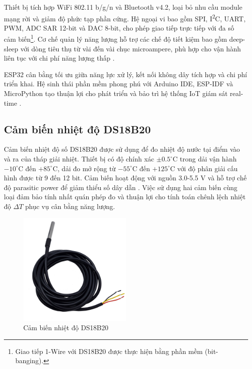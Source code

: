 \documentclass[../main.tex]{subfiles}
\begin{document}
Thiết bị tích hợp WiFi 802.11 b/g/n và Bluetooth v4.2, loại bỏ nhu cầu module mạng rời và giảm độ phức tạp phần cứng. Hệ ngoại vi bao gồm SPI, I\textsuperscript{2}C, UART, PWM, ADC SAR 12-bit và DAC 8-bit, cho phép giao tiếp trực tiếp với đa số cảm biến\footnote{Giao tiếp 1-Wire với DS18B20 được thực hiện bằng phần mềm (bit-banging).}. Cơ chế quản lý năng lượng hỗ trợ các chế độ tiết kiệm bao gồm deep-sleep với dòng tiêu thụ từ vài đến vài chục microampere, phù hợp cho vận hành liên tục với chi phí năng lượng thấp \cite{Espressif_ESP32_technical_reference}.

ESP32 cân bằng tối ưu giữa năng lực xử lý, kết nối không dây tích hợp và chi phí triển khai. Hệ sinh thái phần mềm phong phú với Arduino IDE, ESP-IDF và MicroPython tạo thuận lợi cho phát triển và bảo trì hệ thống IoT giám sát real-time \cite{Espressif_ESP32_technical_reference}.

\subsection{Cảm biến nhiệt độ DS18B20}
\label{sec:ds18b20_sensor}

Cảm biến nhiệt độ số DS18B20 được sử dụng để đo nhiệt độ nước tại điểm vào và ra của tháp giải nhiệt. Thiết bị có độ chính xác $\pm 0.5^\circ\mathrm{C}$ trong dải vận hành $-10^\circ\mathrm{C}$ đến $+85^\circ\mathrm{C}$, dải đo mở rộng từ $-55^\circ\mathrm{C}$ đến $+125^\circ\mathrm{C}$ với độ phân giải cấu hình được từ 9 đến 12 bit. Cảm biến hoạt động với nguồn 3.0-5.5 V và hỗ trợ chế độ parasitic power để giảm thiểu số dây dẫn \cite{datasheet_DS18B20}. Việc sử dụng hai cảm biến cùng loại đảm bảo tính nhất quán phép đo và thuận lợi cho tính toán chênh lệch nhiệt độ $\Delta T$ phục vụ cân bằng năng lượng.

\begin{figure}[H]
    \centering
    \includegraphics[width=0.5\textwidth]{../Hinhve/DS18B20.jpg}
    \caption{Cảm biến nhiệt độ DS18B20 \cite{datasheet_DS18B20}}
    \label{fig:ds18b20}
\end{figure}
\end{document}
